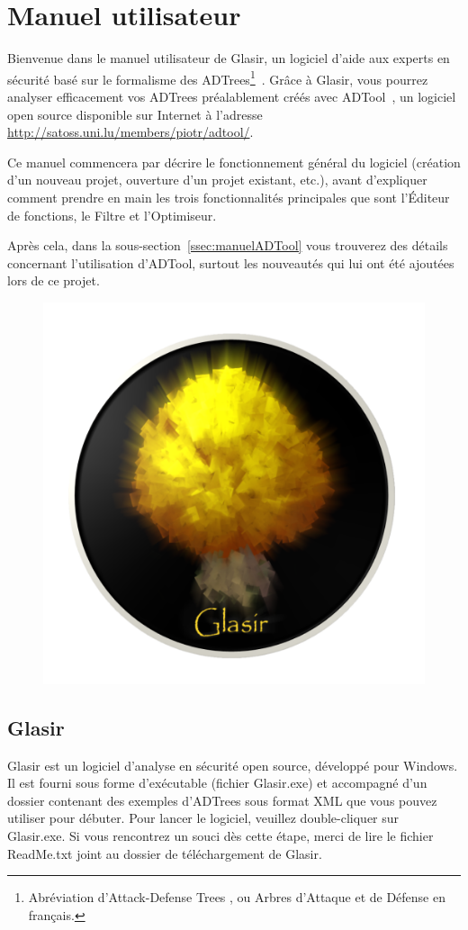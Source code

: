 \section{Manuel utilisateur}
\label{sec:manuel}

Bienvenue dans le manuel utilisateur de Glasir, un logiciel d'aide aux experts en sécurité basé sur le formalisme des ADTrees\footnote{Abréviation d'\og Attack-Defense Trees \fg{}, ou \og Arbres d'Attaque et de Défense\fg{} en français.}~\cite{ADTrees}. Grâce à Glasir, vous pourrez analyser efficacement vos ADTrees préalablement créés avec ADTool~\cite{adtool}, un logiciel open source disponible sur Internet à l'adresse \url{http://satoss.uni.lu/members/piotr/adtool/}.

Ce manuel commencera par décrire le fonctionnement général du logiciel (création d'un nouveau projet, ouverture d'un projet existant, etc.), avant d'expliquer comment prendre en main les trois fonctionnalités principales que sont l'Éditeur de fonctions, le Filtre et l'Optimiseur. 

Après cela, dans la {\sc sous-section}~\ref{ssec:manuelADTool} vous trouverez des détails concernant l'utilisation d'ADTool, surtout les nouveautés qui lui ont été ajoutées lors de ce projet.

	\begin{figure}[H]
        \centering
        \includegraphics[height=0.3\textwidth]{figure/glasir.png}
    \end{figure}

\subsection{Glasir}
\label{ssec:manuelGlasir}

Glasir est un logiciel d'analyse en sécurité open source, développé pour Windows. Il est fourni sous forme d'exécutable (fichier Glasir.exe) et accompagné d'un dossier contenant des exemples d'ADTrees sous format XML que vous pouvez utiliser pour débuter. Pour lancer le logiciel, veuillez double-cliquer sur Glasir.exe. Si vous rencontrez un souci dès cette étape, merci de lire le fichier ReadMe.txt joint au dossier de téléchargement de Glasir.

